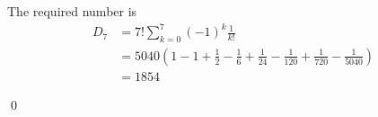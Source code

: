 
The required number is
\begin{align*}
  D_7
  &= 7!\sum_{k=0}^7 (-1)^k\frac{1}{k!} \\
  &= 5040
  \left(
  1 - 1 + \frac{1}{2}  - \frac{1}{6} + \frac{1}{24} - \frac{1}{120}
  + \frac{1}{720} - \frac{1}{5040}
  \right)
  \\
  &= 1854
\end{align*}

\ANSWER
{}
\qed
